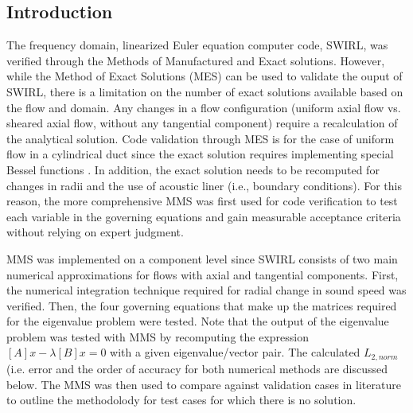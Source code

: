 \subsection{Introduction}
The frequency domain, linearized Euler equation computer code, SWIRL, was 
verified through the Methods of Manufactured and Exact solutions. 
However, while the Method of Exact Solutions (MES) can be used to validate the
ouput of SWIRL, there is a limitation on the number of exact solutions available 
based on the flow and domain.  Any changes in a flow configuration (uniform axial flow vs. sheared axial flow, without any tangential 
component) require a recalculation of the analytical solution. Code validation 
through MES is for the case of uniform flow in a cylindrical 
duct since the exact solution requires implementing special Bessel functions
. In addition, the exact solution needs to be recomputed for changes in radii 
and the use of acoustic liner (i.e., boundary conditions). For this reason, 
the more comprehensive MMS was first used for code verification to test each 
variable in the governing equations and gain measurable acceptance criteria 
without relying on expert judgment.

MMS was implemented on a component level since SWIRL consists
of two main numerical approximations for flows with axial and tangential 
components. First, the numerical integration technique required for radial 
change in sound speed was verified. Then, the four governing equations that make
up the matrices required for the eigenvalue problem were tested. Note that the 
output of the eigenvalue problem was tested with MMS by recomputing the expression
$[A] {x} - \lambda [B] {x} = 0$ with a given eigenvalue/vector pair. 
The calculated $L_{2,norm}$ (i.e. error and the order of accuracy for both numerical methods are discussed below.
The MMS was then used to compare against validation cases in literature to outline 
the methodolody for test cases for which there is no solution.
